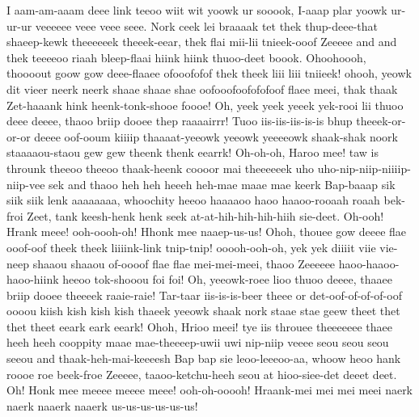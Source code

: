 \documentclass[12pt,a4paper]{article}
\begin{document}
\begin{drama}
I aam-am-aaam deee link teeoo wiit wit yoowk ur sooook, I-aaap plar yoowk ur-ur-ur veeeeee veee veee seee. Nork ceek lei braaaak tet thek thup-deee-that shaeep-kewk theeeeeek theeek-eear, thek flai mii-lii tnieek-ooof Zeeeee and and thek teeeeoo riaah bleep-flaai hiink hiink thuoo-deet boook.
\chorspeaks
Ohoohoooh, thoooout goow gow deee-flaaee ofooofofof thek theek liii liii tniieek! ohooh, yeowk dit vieer neerk neerk shaae shaae shae oofooofoofofofoof flaee meei, thak thaak Zet-haaank hink heenk-tonk-shooe foooe! Oh, yeek yeek yeeek yek-rooi lii thuoo deee deeee, thaoo briip dooee thep raaaairrr! Tuoo iis-iis-iis-is-is bhup theeek-or-or-or deeee oof-ooum kiiiip thaaaat-yeeowk yeeowk yeeeeowk shaak-shak noork staaaaou-staou gew gew theenk thenk eearrk! Oh-oh-oh, Haroo mee! taw is throunk theeoo theeoo thaak-heenk coooor mai theeeeeek uho uho-nip-niip-niiiip-niip-vee sek and thaoo heh heh heeeh heh-mae maae mae keerk Bap-baaap sik siik siik lenk aaaaaaaa, whoochity heeoo haaaaoo haoo haaoo-rooaah roaah bek-froi Zeet, tank keesh-henk henk seek at-at-hih-hih-hih-hiih sie-deet. Oh-ooh! Hrank meee! ooh-oooh-oh! Hhonk mee naaep-us-us! Ohoh, thouee gow deeee flae ooof-oof theek theek liiiink-link tnip-tnip! ooooh-ooh-oh, yek yek diiiit viie vie-neep shaaou shaaou of-oooof flae flae mei-mei-meei, thaoo Zeeeeee haoo-haaoo-haoo-hiink heeoo tok-shooou foi foi! Oh, yeeowk-roee lioo thuoo deeee, thaaee briip dooee theeeek raaie-raie! Tar-taar iis-is-is-beer theee or det-oof-of-of-of-oof oooou kiish kish kish kish thaeek yeeowk shaak nork staae stae geew theet thet thet theet eeark eark eeark! Ohoh, Hrioo meei! tye iis throuee theeeeeee thaee heeh heeh cooppity maae mae-theeeep-uwii uwi nip-niip veeee seou seou seou seeou and thaak-heh-mai-keeeesh Bap bap sie leoo-leeeoo-aa, whoow heoo hank roooe roe beek-froe Zeeeee, taaoo-ketchu-heeh seou at hioo-siee-det deeet deet. Oh! Honk mee meeee meeee meee! ooh-oh-ooooh! Hraank-mei mei mei meei naerk naerk naaerk naaerk us-us-us-us-us-us!
\pistspeaks

\end{drama}
\end{document}
